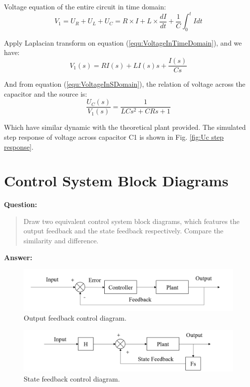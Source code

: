 \documentclass[12pt, oneside]{article}
\begin{document}
\vspace{0.2cm}
Voltage equation of the entire circuit in time domain:
\begin{equation}
    V_1 = U_R+U_L+U_C = R\times I+L\times \frac{dI}{dt}+\frac{1}{C}\int_0^t Idt
    \label{equ:VoltageInTimeDomain}
\end{equation}

Apply Laplacian transform on equation (\ref{equ:VoltageInTimeDomain}), and we have:
\begin{equation}
        V_1(s) = RI(s)+ LI(s)s+\frac{I(s)}{Cs}
        \label{equ:VoltageInSDomain}
\end{equation}

And from equation (\ref{equ:VoltageInSDomain}), the relation of voltage across the capacitor and the source is:
\begin{equation}
    \frac{U_C(s)}{V_1(s)}=\frac{1}{LCs^2+CRs+1}
\end{equation}

Which have similar dynamic with the theoretical plant provided. The simulated step response of voltage across capacitor C1 is shown in Fig. \ref{fig:Uc step response}.

\pagebreak

\section{Control System Block Diagrams}
\textbf{Question:}
\begin{quote}
    Draw two equivalent control system block diagrams, which features the output feedback and the state feedback respectively. Compare the similarity and difference. 
\end{quote}
\textbf{Answer:}

\begin{figure}[htbp]
    \centering
    \includegraphics[height = 0.07\paperheight]{Report/pics/OutputFeedbackDiagram.png}
    \caption{Output feedback control diagram.}
    \label{fig:my_label}
\end{figure}

\begin{figure}[htbp]
    \centering
    \includegraphics[height = 0.1\paperheight]{Report/pics/StateFeedbackDiagram.png}
    \caption{State feedback control diagram.}
    \label{fig:my_label}
\end{figure}
\end{document}
